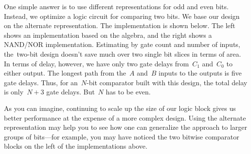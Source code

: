 One simple answer is to use different representations for odd and
even bits.  Instead, we optimize a logic circuit
for comparing two bits.  We base our design on the alternate 
representation.  The implementation is shown below.  The left
shows an implementation based on the algebra, and the right shows
a NAND/NOR implementation.  Estimating by gate count and number of
inputs, the~\mbox{two-bit} design doesn't save much over two
single bit slices in terms of area.  In terms of delay, however,
we have only two gate delays from~$C_1$ and~$C_0$ to either output.
The longest path from the~$A$ and~$B$ inputs to the outputs is
five gate delays.  Thus, for an~\mbox{$N$-bit} comparator built
with this design, the total delay is only~$N+3$ gate delays.
But~$N$ has to be even.

\hspace{.25in}%

As you can imagine, continuing to scale up the size of our logic
block gives us better performance at the expense of a more complex
design.  Using the alternate representation may help you to see
how one can generalize the approach to larger groups of bits---for
example, you may have noticed the two bitwise 
comparator blocks on the left of the implementations above.

\vfill

\pagebreak

